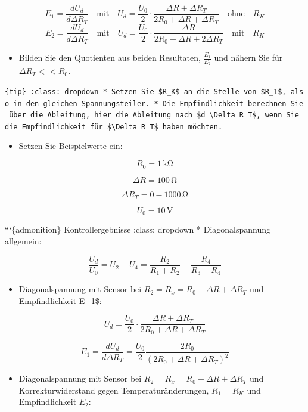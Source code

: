 \documentclass[
]{book}
\providecommand{\tightlist}{%
  \setlength{\itemsep}{0pt}\setlength{\parskip}{0pt}}
\begin{document}
\[E_{1}  = \frac{dU_d}{d\Delta R_T} \quad \textrm{mit} \quad U_d = \frac{U_0}{2} \cdot \frac{\Delta R + \Delta R_T}{2R_0 + \Delta R + \Delta R_T} \quad \textrm{ohne} \quad R_{K}\] \[E_2 = \frac{dU_d}{d\Delta R_T} \quad \textrm{mit} \quad U_d = \frac{U_0}{2} \cdot \frac{\Delta R}{2R_0 + \Delta R + 2\Delta R_T} \quad \textrm{mit} \quad R_{K}\]

\begin{itemize}
\tightlist
\item
  Bilden Sie den Quotienten aus beiden Resultaten, \(\frac{E_{1}}{E_{2}}\) und nähern Sie für \(\Delta R_{T} << R_{0}\).
\end{itemize}

\texttt{\{tip\}\ :class:\ dropdown\ *\ Setzen\ Sie\ \$R\_K\$\ an\ die\ Stelle\ von\ \$R\_1\$,\ also\ in\ den\ gleichen\ Spannungsteiler.\ *\ Die\ Empfindlichkeit\ berechnen\ Sie\ über\ die\ Ableitung,\ hier\ die\ Ableitung\ nach\ \$d\ \textbackslash{}Delta\ R\_T\$,\ wenn\ Sie\ die\ Empfindlichkeit\ für\ \$\textbackslash{}Delta\ R\_T\$\ haben\ möchten.}

\begin{itemize}
\tightlist
\item
  Setzen Sie Beispielwerte ein:
\end{itemize}

\[R_0 = 1\,\mathrm{k\Omega}\]

\[\Delta R = 100\,\mathrm\Omega\]

\[\Delta R_T = 0-1000\,\mathrm\Omega\]

\[U_0 = 10\,\mathrm V\]

```\{admonition\} Kontrollergebnisse :class: dropdown * Diagonalspannung allgemein:

\[\frac{U_d}{U_0} = U_2 - U_4 = \frac{R_2}{R_1+R_2} - \frac{R_4}{R_3+R_4}\]

\begin{itemize}
\tightlist
\item
  Diagonalspannung mit Sensor bei \(R_2 = R_x = R_0 + \Delta R + \Delta R_T\) und Empfindlichkeit E\_1\$:
\end{itemize}

\[U_d = \frac{U_0}{2} \cdot \frac{\Delta R + \Delta R_T}{2R_0 + \Delta R + \Delta R_T}\]

\[E_1 = \frac{dU_d}{d\Delta R_T} = \frac{U_0}{2} \frac{2R_0}{(2R_0 + \Delta R + \Delta R_T)^2}\]

\begin{itemize}
\tightlist
\item
  Diagonalspannung mit Sensor bei \(R_2 = R_x = R_0 + \Delta R + \Delta R_T\) und Korrekturwiderstand gegen Temperaturänderungen, \(R_1 = R_K\) und Empfindlichkeit \(E_2\):
\end{itemize}
\end{document}
